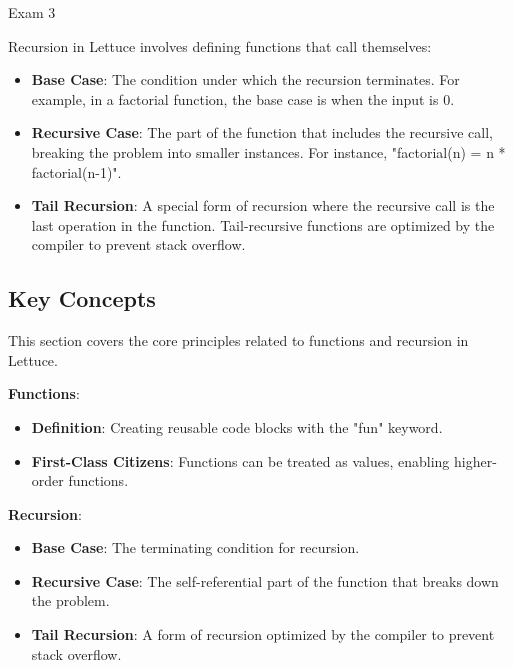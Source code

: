 \begin{examnotes}{Exam 3}
    \begin{highlight}
        Recursion in Lettuce involves defining functions that call themselves:
        \begin{itemize}
            \item \textbf{Base Case}: The condition under which the recursion terminates. For example, in a factorial function, the base case is when the input is 0.
            \item \textbf{Recursive Case}: The part of the function that includes the recursive call, breaking the problem into smaller instances. For instance, "factorial(n) = n * factorial(n-1)".
            \item \textbf{Tail Recursion}: A special form of recursion where the recursive call is the last operation in the function. Tail-recursive functions are optimized by the compiler to prevent stack overflow.
        \end{itemize}
    \end{highlight}
    
    \subsection*{Key Concepts}
    
    \begin{highlight}
        This section covers the core principles related to functions and recursion in Lettuce.
    
        \textbf{Functions}:
        \begin{itemize}
            \item \textbf{Definition}: Creating reusable code blocks with the "fun" keyword.
            \item \textbf{First-Class Citizens}: Functions can be treated as values, enabling higher-order functions.
        \end{itemize}
        
        \textbf{Recursion}:
        \begin{itemize}
            \item \textbf{Base Case}: The terminating condition for recursion.
            \item \textbf{Recursive Case}: The self-referential part of the function that breaks down the problem.
            \item \textbf{Tail Recursion}: A form of recursion optimized by the compiler to prevent stack overflow.
        \end{itemize}
    \end{highlight}
\end{examnotes}

